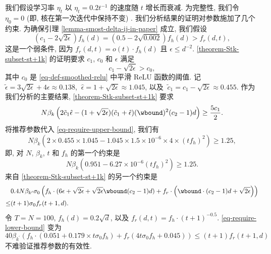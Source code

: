 我们假设学习率 $\eta_t $ 以 $\eta_t = 0.2 t^{-1}$ 的速度随 $t$ 增长而衰减. 
为完整性, 我们令 $\eta_0 = 0$ (即, 核在第一次迭代中保持不变) . 
我们分析结果的证明对参数施加了几个约束. 
为确保引理 \ref{lemma-smost-delta-ij-in-paper} 成立, 我们假设
\begin{equation}
    (c_1 - 2\sqrt{2\epsilon}) f_h(d) = (0.5 - 2\sqrt{0.002}) f_h(d) > f_r(d,t),
\end{equation}
这是一个弱条件, 因为 $f_r(d,t) =  o(t) \cdot f_h(d)$ 且 $\epsilon \leq d^{-2}$. 
\ref{theorem-Stk-subset-st+1k} 的证明要求 $c_1$, $c_0$ 和 $\epsilon$ 满足
\begin{equation}
    c_1 - \sqrt{2\epsilon} > c_0,
\end{equation}
其中 $c_0$ 是 \ref{eq-def-smoothed-relu} 中平滑 ReLU 函数的阈值. 
记 $\tilde{\epsilon} = 3\sqrt{2\epsilon} + 4\epsilon 
\approx 0.138$, $\ \hat{\epsilon} = 1 + \sqrt{2\epsilon} \approx 1.045$, 以及 $\ \tilde{c}_1 = c_1 - \sqrt{2\epsilon} \approx 0.455$.  
作为我们分析的主要结果, \ref{theorem-Stk-subset-st+1k} 要求
\begin{equation}\label{eq-require-upper-bound}
N \beta_k \left( 
        2\tilde{c}_1\hat{\epsilon} - (1+\sqrt{2\epsilon})(\tilde{c}_1 + \hat{\epsilon})(\wbound)^2 (c_2 - 1) d
        \right) \geq \frac{5c_1}{2}.
\end{equation}
将推荐参数代入 \ref{eq-require-upper-bound}, 我们有
\begin{equation}
    N \beta_k \left( 
        2 \times 0.455 \times 1.045 - 1.045 \times 1.5 \times 10^{-6} \times 4 \times (t f_h)^2
        \right) \geq 1.25,
\end{equation}
即, 对 $N$, $\beta_k$, $t$ 和 $f_h$ 的第一个约束是
\begin{equation}
    N \beta_k \left( 0.951 - 6.27 \times 10^{-6} (tf_h)^2 \right) \geq 1.25.
\end{equation}
来自 \ref{theorem-Stk-subset-st+1k} 的另一个约束是
\begin{equation}\label{eq-require-lower-bound}
\begin{aligned}
    &0.4 N \beta_{k^{\prime}} \sigma_0 \left(
    f_h \cdot (6\epsilon + \sqrt{2\epsilon} + \sqrt{2\epsilon} \wbound (c_2 - 1)d ) + f_r \cdot \left(\wbound \cdot (c_2 - 1) d + \sqrt{2\epsilon}\right)
    \right) \\
    \leq &(t+1) \sigma_0 f_r(t+1, d).
\end{aligned}
\end{equation}
令 $T = N = 100$, $f_h(d) = 0.2\sqrt{d}$, 以及 $f_r(d, t) = f_h \cdot (t+1)^{-0.5}$. 
\ref{eq-require-lower-bound} 变为
\begin{equation}
    40 \beta_{k^{\prime}} \left( f_h \cdot (0.051 + 0.179 \times t \sigma_0 f_h) + f_r (4t \sigma_0 f_h + 0.045) \right) \leq (t+1) f_r(t+1, d)
\end{equation}
不难验证推荐参数的有效性. 